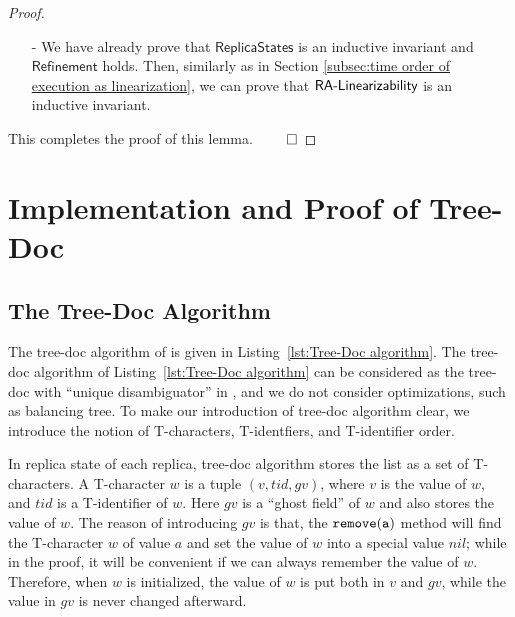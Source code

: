 \begin {proof}
\begin{itemize}
\begin{itemize}
    \item[-] Assume we do $\alabellong[{\tt read}]{}{s}{}$ on replica state $\sigma$. Assume $\sigma = w_1 \cdot \ldots \cdot w_n$, and for each $i$, $w_i = (id_i,v_i,degree_i,flag_i)$. Then, $s$ is the projection of $v_1 \cdot \ldots \cdot v_n$ into values with flag $\mathit{true}$. Assume $\refmap(\sigma) = (l,T)$. We can see that $l = v_1 \cdot \ldots \cdot v_n$ and $T = \{ v_i \vert flag_i = \mathit{false} \}$. Thus, we have $\refmap(\sigma) \specarrow{\alabellong[{\tt read}]{}{s}{}} \refmap(\sigma)$.
    \end{itemize}

\item[-] We have already prove that $\mathsf{ReplicaStates}$ is an inductive invariant and $\mathsf{Refinement}$ holds. Then, similarly as in Section \ref{subsec:time order of execution as linearization}, we can prove that $\mathsf{RA\text{-}Linearizability{}}$ is an inductive invariant.
\end{itemize}

This completes the proof of this lemma. $\qed$
\end {proof}









\section{Implementation and Proof of Tree-Doc}
\label{sec:implementation and proof of tree-doc}


\subsection{The Tree-Doc Algorithm}
\label{subsec:the Tree-Doc algorithm}

The tree-doc algorithm of \cite{DBLP:conf/icdcs/PreguicaMSL09,DBLP:journals/corr/abs-0710-1784} is given in Listing~\ref{lst:Tree-Doc algorithm}. The tree-doc algorithm of Listing~\ref{lst:Tree-Doc algorithm} can be considered as the tree-doc with ``unique disambiguator'' in \cite{DBLP:conf/icdcs/PreguicaMSL09,DBLP:journals/corr/abs-0710-1784}, and we do not consider optimizations, such as balancing tree. To make our introduction of tree-doc algorithm clear, we introduce the notion of T-characters, T-identfiers, and T-identifier order.

In replica state of each replica, tree-doc algorithm stores the list as a set of T-characters. A T-character $w$ is a tuple $(v,tid,gv)$, where $v$ is the value of $w$, and $tid$ is a T-identifier of $w$. Here $gv$ is a ``ghost field'' of $w$ and also stores the value of $w$. The reason of introducing $gv$ is that, the $\alabelshort[{\tt remove}]{a}$ method will find the T-character $w$ of value $a$ and set the value of $w$ into a special value $nil$; while in the proof, it will be convenient if we can always remember the value of $w$. Therefore, when $w$ is initialized, the value of $w$ is put both in $v$ and $gv$, while the value in $gv$ is never changed afterward.


